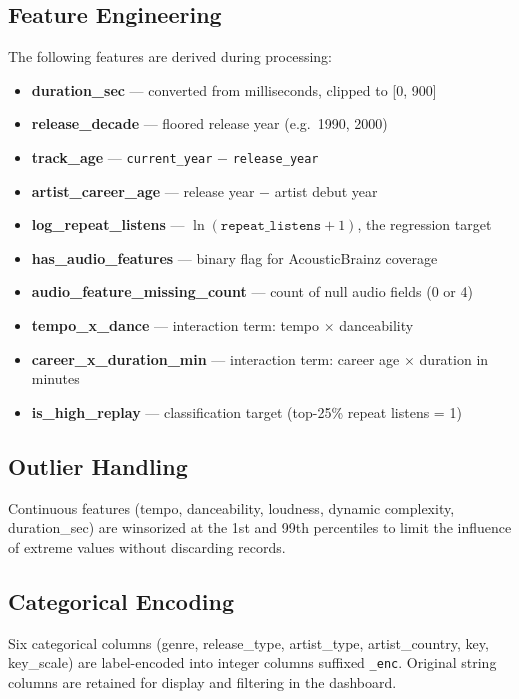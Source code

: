 \documentclass[11pt, letterpaper]{article}
\begin{document}
\subsection{Feature Engineering}

The following features are derived during processing:

\begin{itemize}[noitemsep]
    \item \textbf{duration\_sec} — converted from milliseconds, clipped to [0, 900]
    \item \textbf{release\_decade} — floored release year (e.g.\ 1990, 2000)
    \item \textbf{track\_age} — \texttt{current\_year} $-$ \texttt{release\_year}
    \item \textbf{artist\_career\_age} — release year $-$ artist debut year
    \item \textbf{log\_repeat\_listens} — $\ln(\texttt{repeat\_listens} + 1)$, the regression target
    \item \textbf{has\_audio\_features} — binary flag for AcousticBrainz coverage
    \item \textbf{audio\_feature\_missing\_count} — count of null audio fields (0 or 4)
    \item \textbf{tempo\_x\_dance} — interaction term: tempo $\times$ danceability
    \item \textbf{career\_x\_duration\_min} — interaction term: career age $\times$ duration in minutes
    \item \textbf{is\_high\_replay} — classification target (top-25\% repeat listens = 1)
\end{itemize}

\subsection{Outlier Handling}

Continuous features (tempo, danceability, loudness, dynamic complexity,
duration\_sec) are winsorized at the 1st and 99th percentiles to limit the
influence of extreme values without discarding records.

\subsection{Categorical Encoding}

Six categorical columns (genre, release\_type, artist\_type, artist\_country,
key, key\_scale) are label-encoded into integer columns suffixed \texttt{\_enc}.
Original string columns are retained for display and filtering in the dashboard.
\end{document}
